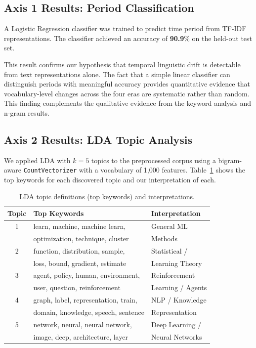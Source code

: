 \documentclass{article}
\begin{document}
\subsection{Axis 1 Results: Period Classification}

A Logistic Regression classifier was trained to predict
time period from TF-IDF representations. The classifier
achieved an accuracy of \textbf{90.9}\%
on the held-out test set.

This result confirms our hypothesis
that temporal linguistic drift is detectable from text
representations alone. The fact that a simple linear
classifier can distinguish periods with meaningful accuracy
provides quantitative evidence that vocabulary-level
changes across the four eras are systematic rather than
random. This finding complements the qualitative evidence
from the keyword analysis and n-gram results.

\subsection{Axis 2 Results: LDA Topic Analysis}

We applied LDA with $k=5$ topics to the preprocessed corpus
using a bigram-aware \texttt{CountVectorizer} with a vocabulary
of 1,000 features. Table~\ref{tab:lda} shows the top keywords
for each discovered topic and our interpretation of each.

\begin{table}[H]
\centering
\small
\caption{LDA topic definitions (top keywords) and
         interpretations.}
\label{tab:lda}
\begin{tabular}{cll}
\toprule
\textbf{Topic} & \textbf{Top Keywords} & \textbf{Interpretation} \\
\midrule
1 & learn, machine, machine learn, & General ML \\
  & optimization, technique, cluster & Methods \\
2 & function, distribution, sample, & Statistical / \\
  & loss, bound, gradient, estimate & Learning Theory \\
3 & agent, policy, human, environment, & Reinforcement \\
  & user, question, reinforcement & Learning / Agents \\
4 & graph, label, representation, train, & NLP / Knowledge \\
  & domain, knowledge, speech, sentence & Representation \\
5 & network, neural, neural network, & Deep Learning / \\
  & image, deep, architecture, layer & Neural Networks \\
\bottomrule
\end{tabular}
\end{table}
\end{document}
